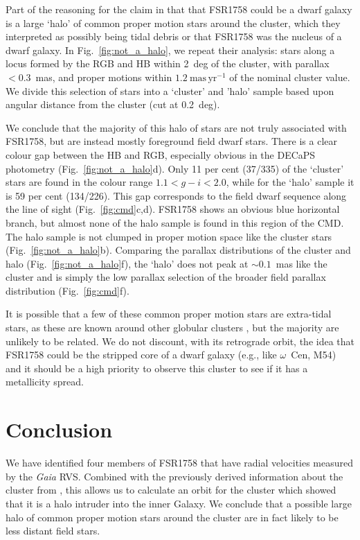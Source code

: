\documentclass[fleqn,usenatbib,letters]{mnras}
\newcommand{\masyr}{~\ensuremath{\textrm{mas}\,\textrm{yr}^{-1}}}
\begin{document}
Part of the reasoning for the claim in  that that FSR1758 could be a dwarf galaxy is a large `halo' of common proper motion stars around the cluster, which they interpreted as possibly being tidal debris or that FSR1758 was the nucleus of a dwarf galaxy. In Fig.\ \ref{fig:not_a_halo}, we repeat their analysis: stars along a locus formed by the RGB and HB within 2~deg of the cluster, with parallax $<0.3$~mas, and proper motions within $1.2\masyr$ of the nominal cluster value. We divide this selection of stars into a `cluster' and 'halo' sample based upon angular distance from the cluster (cut at 0.2~deg).

We conclude that the majority of this halo of stars are not truly associated with FSR1758, but are instead mostly foreground field dwarf stars. There is a clear colour gap between the HB and RGB, especially obvious in the DECaPS photometry (Fig.\ \ref{fig:not_a_halo}d). Only 11 per cent (37/335) of the `cluster' stars are found in the colour range $1.1<g-i<2.0$,  while for the `halo' sample it is 59 per cent (134/226). This gap corresponds to the field dwarf sequence along the line of sight (Fig.\ \ref{fig:cmd}c,d). FSR1758 shows an obvious blue horizontal branch, but almost none of the halo sample is found in this region of the CMD. The halo sample is not clumped in proper motion space like the cluster stars (Fig.\ \ref{fig:not_a_halo}b). Comparing the parallax distributions of the cluster and halo (Fig.\ \ref{fig:not_a_halo}f), the `halo' does not peak at $\sim0.1$~mas like the cluster and is simply the low parallax selection of the broader field parallax distribution (Fig.\ \ref{fig:cmd}f).

It is possible that a few of these common proper motion stars are extra-tidal stars, as these are known around other globular clusters \citep[e.g.,][]{Simpson:2017be}, but the majority are unlikely to be related. We do not discount, with its retrograde orbit, the idea that FSR1758 could be the stripped core of a dwarf galaxy (e.g., like $\omega$~Cen, M54) and it should be a high priority to observe this cluster to see if it has a metallicity spread.

\section{Conclusion}
We have identified four members of FSR1758 that have radial velocities measured by the \textit{Gaia} RVS. Combined with the previously derived information about the cluster from , this allows us to calculate an orbit for the cluster which showed that it is a halo intruder into the inner Galaxy. We conclude that a possible large halo of common proper motion stars around the cluster are in fact likely to be less distant field stars. 
\end{document}
